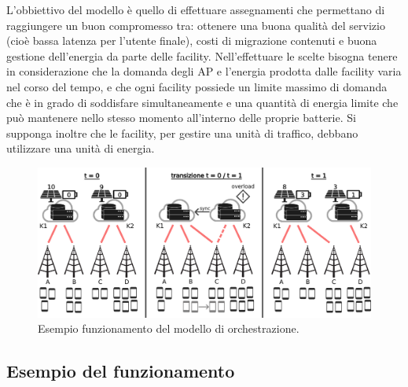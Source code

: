 L'obbiettivo del modello è quello di effettuare assegnamenti che permettano di raggiungere un buon compromesso tra: ottenere una buona qualità del servizio (cioè bassa latenza per l'utente finale), costi di migrazione contenuti e buona gestione dell'energia da parte delle facility. Nell'effettuare le scelte bisogna tenere in considerazione che la domanda degli AP e l'energia prodotta dalle facility varia nel corso del tempo, e che ogni facility possiede un limite massimo di domanda che è in grado di soddisfare simultaneamente e una quantità di energia limite che può mantenere nello stesso momento all'interno delle proprie batterie. Si supponga inoltre che le facility, per gestire una unità di traffico, debbano utilizzare una unità di energia.

\begin{figure}[t]
    \centering
    \includegraphics[width = 150mm]{img/esempio-assegnamenti.jpg}
    \caption{Esempio funzionamento del modello di orchestrazione.}
    \label{fig:esempio-assegnamenti}
\end{figure}


%
%
\subsection{Esempio del funzionamento}
\label{sub-sec:esempio-funzionamento}

